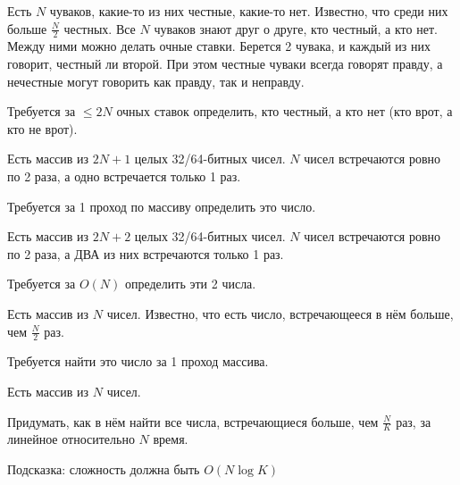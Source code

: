 \begin{problem}
Есть $N$ чуваков, какие-то из них честные, какие-то нет. Известно, что среди них больше $\frac{N}{2}$ честных. Все $N$ чуваков знают друг о друге, кто честный, а кто нет.
Между ними можно делать очные ставки. Берется 2 чувака, и каждый из них говорит, честный ли второй. При этом честные чуваки всегда говорят правду, а нечестные могут говорить как правду, так и неправду.

Требуется за $\leq 2N$ очных ставок определить, кто честный, а кто нет (кто врот, а кто не врот).

\end{problem}
\begin{problem}

Есть массив из $2N + 1$ целых 32/64-битных чисел. $N$ чисел встречаются ровно по 2
раза, а одно встречается только 1 раз.

Требуется за 1 проход по массиву определить это число.

\end{problem}
\begin{problem}

Есть массив из $2N + 2$ целых 32/64-битных чисел. $N$ чисел встречаются ровно по 2
раза, а ДВА из них встречаются только 1 раз.

Требуется за $O(N)$ определить эти 2 числа.

\end{problem}
\begin{problem}

Есть массив из $N$ чисел. Известно, что есть число, встречающееся в нём больше, чем $\frac{N}{2}$ раз.

Требуется найти это число за 1 проход массива.

\end{problem}
\begin{problem}

Есть массив из $N$ чисел.

Придумать, как в нём найти все числа, встречающиеся больше, чем $\frac{N}{K}$ раз, за линейное относительно $N$ время.

Подсказка: сложность должна быть $O(N\log{K})$

\end{problem}
